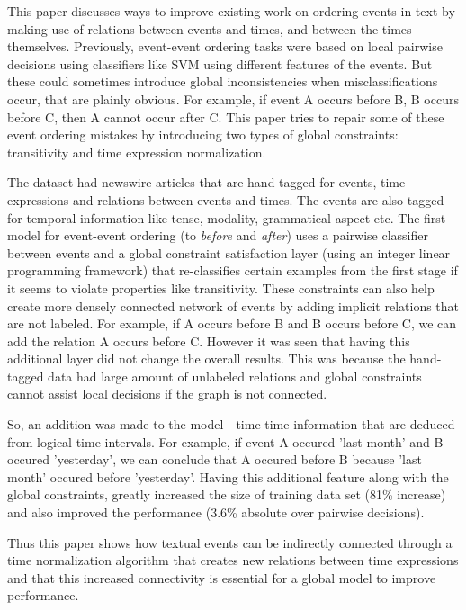 


This paper discusses ways to improve existing work on ordering events
in text by making use of relations between events and times,
and between the times themselves. Previously, event-event ordering tasks were based on local pairwise decisions
using classifiers like SVM using different features of the events. But these could sometimes introduce global
inconsistencies when misclassifications occur, that are plainly obvious. For example, if
event A occurs before B, B occurs before C, then A cannot occur after C. This paper tries
to repair some of these event ordering mistakes by introducing two types of global
constraints: transitivity and time expression normalization. 

The dataset had newswire articles that are hand-tagged for events, time expressions and
relations between events and times. The events are also tagged for temporal information
like tense, modality, grammatical aspect etc. The first model for event-event ordering (to
{\em before} and {\em after}) uses a pairwise classifier between events and a
global constraint satisfaction layer (using an integer linear programming framework) that
re-classifies certain examples from the first stage if it seems to violate properties like
transitivity. These constraints can also help create more densely connected network of
events by adding implicit relations that are not labeled. For example, if A occurs before
B and B occurs before C, we can add the relation A occurs before C. However it was seen
that having this additional layer did not change the overall results. This was because the
hand-tagged data had large amount of unlabeled relations and global constraints cannot
assist local decisions if the graph is not connected.

So, an addition was made to the model - time-time information that are deduced from
logical time intervals. For example, if event A occured 'last month' and B occured
'yesterday', we can conclude that A occured before B because 'last month' occured before
'yesterday'. Having this additional feature along with the global constraints, greatly
increased the size of  training data set (81\% increase) and also improved the performance
(3.6\% absolute over pairwise decisions).

Thus this paper shows how textual events can be indirectly connected through a time
normalization algorithm that creates new relations between time expressions  and that this
increased connectivity is essential for a global model to improve performance.\\


